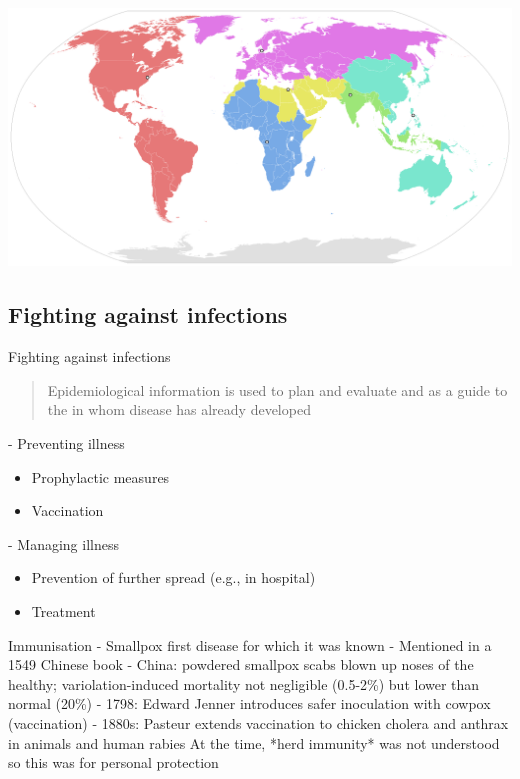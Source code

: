 \documentclass[aspectratio=43]{beamer}
\begin{document}
\begin{frame}
    \includegraphics[width=\textwidth]{../FIGS/1280px-World_Health_Organisation_regional_offices.png}
\end{frame}



\subsection{Fighting against infections}

\begin{frame}{Fighting against infections}
\begin{quote}
    Epidemiological information is used to plan and evaluate  and as a guide to the  in whom disease has already developed  
\end{quote}
\vfill
- Preventing illness
\begin{itemize}
    \item Prophylactic measures
    \item Vaccination
\end{itemize}
\vfill
- Managing illness
\begin{itemize}
    \item Prevention of further spread (e.g., in hospital) 
    \item Treatment
\end{itemize}
\end{frame}


\begin{frame}{Immunisation}
- Smallpox first disease for which it was known 
\vfill
- Mentioned in a 1549 Chinese book
\vfill
- China: powdered smallpox scabs blown up noses of the healthy; variolation-induced mortality not negligible (0.5-2\%) but lower than normal (20\%)
\vfill
- 1798:  Edward Jenner introduces safer inoculation with cowpox (vaccination)
\vfill
- 1880s: Pasteur extends vaccination to chicken cholera and anthrax in animals and human rabies
\vfill
At the time, *herd immunity* was not understood so this was for personal protection
\end{frame}
\end{document}
